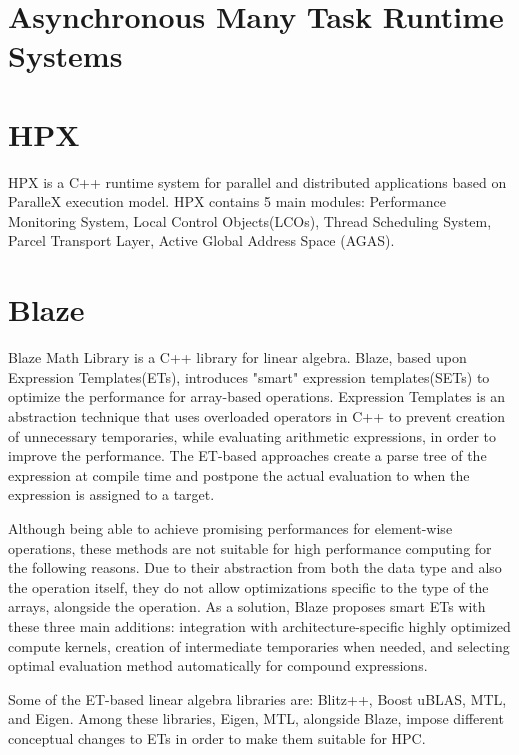 \section{Asynchronous Many Task Runtime Systems}

\vspace{\baselineskip}
\section{HPX}
HPX\cite{kaiser2014hpx} is a C++ runtime system for parallel and distributed applications based on ParalleX execution model\cite{kaiser2009parallex}. 
HPX contains 5 main modules: Performance Monitoring System, Local Control Objects(LCOs), Thread Scheduling System, Parcel Transport Layer, Active Global Address Space (AGAS).

\vspace{\baselineskip}
\section{Blaze}
Blaze Math Library\cite{iglberger2012expression} is a C++ library for linear algebra. Blaze, based upon Expression Templates(ETs)\cite{veldhuizen1995expression}, introduces "smart" expression templates(SETs)\cite{iglberger2012expression} to optimize the performance for array-based operations. Expression Templates\cite{veldhuizen1995expression} is an abstraction technique that uses overloaded operators in C++ to prevent creation of unnecessary temporaries, while evaluating arithmetic expressions, in order to improve the performance\cite{iglberger2012expression}. The ET-based approaches create a parse tree of the expression at compile time and postpone the actual evaluation to when the expression is assigned to a target. 

Although being able to achieve promising performances for element-wise operations, these methods are not suitable for high performance computing for the following reasons. Due to their abstraction from both the data type and also the operation itself, they do not allow optimizations specific to the type of the arrays, alongside the operation\cite{iglberger2012expression}. As a solution, Blaze proposes smart ETs with these three main additions: integration with architecture-specific highly optimized compute kernels, creation of intermediate temporaries when needed, and selecting optimal evaluation method automatically for compound expressions\cite{iglberger2012expression}. 

Some of the ET-based linear algebra libraries are: Blitz++\cite{Blitz}, Boost uBLAS\cite{ublas}, MTL\cite{MTL}, and Eigen\cite{guennebaud2010eigen}. Among these libraries, Eigen, MTL, alongside Blaze, impose different conceptual changes to ETs in order to make them suitable for HPC.    
 
